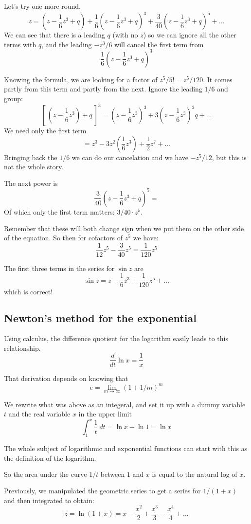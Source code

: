 \documentclass[11pt, oneside]{article}
\begin{document}
Let's try one more round.
\[ z  = (z - \frac{1}{6}z^3 + q) +  \frac{1}{6}(z  - \frac{1}{6}z^3 + q)^3 + \frac{3}{40}(z  - \frac{1}{6}z^3 + q)^5 + \dots   \]
We can see that there is a leading $q$ (with no $z$) so we can ignore all the other terms with $q$, and the leading $-z^3/6$ will cancel the first term from
\[  \frac{1}{6}(z  - \frac{1}{6}z^3 + q)^3 \]

Knowing the formula, we are looking for a factor of $z^5/5! = z^5/120$.  It comes partly from this term and partly from the next.  Ignore the leading $1/6$ and group:
\[  [ \ (z  - \frac{1}{6}z^3) + q \ ]^3  = (z  - \frac{1}{6}z^3)^3  + 3(z  - \frac{1}{6}z^3)^2q + \dots \]
We need only the first term 
\[ = z^3 - 3 z^2 (\frac{1}{6}z^3) + \frac{1}{2}z^7 + \dots \]
Bringing back the $1/6$ we can do our cancelation and we have $-z^5/12$, but this is not the whole story.

The next power is 
\[ \frac{3}{40}(z  - \frac{1}{6}z^3 + q)^5 = \]
Of which only the first term matters:  $3/40 \cdot z^5$.

Remember that these will both change sign when we put them on the other side of the equation.  So then for cofactors of $z^5$ we have:
\[ \frac{1}{12}z^5 -  \frac{3}{40}z^5 = \frac{1}{120}z^5  \]

The first three terms in the series for $\sin z$ are
\[ \sin z = z - \frac{1}{6}z^3 + \frac{1}{120}z^5 + \dots  \]
which is correct!

\subsection*{Newton's method for the exponential}
Using calculus, the difference quotient for the logarithm easily leads to this relationship.
\[ \frac{d}{dt} \ln x = \frac{1}{x} \]

That derivation depends on knowing that 
\[ e = \lim_{m \rightarrow \infty} (1 + 1/m)^m \]

We rewrite what was above as an integeral, and set it up with a dummy variable $t$ and the real variable $x$ in the upper limit
\[ \int_1^x \frac{1}{t} \ dt = \ln x - \ln 1 = \ln x \]

The whole subject of logarithmic and exponential functions can start with this as the definition of the logarithm.

So the area under the curve $1/t$ between $1$ and $x$ is equal to the natural log of $x$.

Previously, we manipulated the geometric series to get a series for $1/(1 + x)$ and then integrated to obtain: 
\[ z = \ln (1 + x) = x - \frac{x^2}{2} + \frac{x^3}{3} - \frac{x^4}{4} + \dots \]
\end{document}
